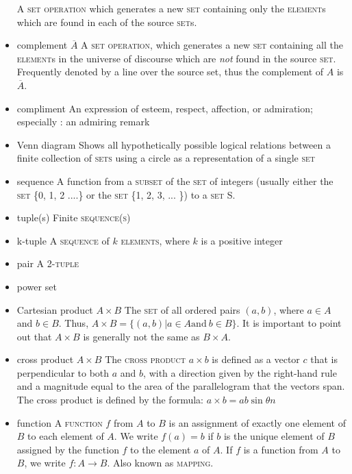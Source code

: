 \documentclass{article}
\newcommand{\term}[1]{\textsc{#1}}
\begin{document}
\begin{itemize}
  \subitem A \term{set operation} which generates a new \term{set} containing only the \term{element}s which are found in each of the source \term{set}s.
\item complement $\overline{A}$
  \subitem A \term{set operation}, which generates a new \term{set} containing all the \term{element}s in the universe of discourse which are \emph{not} found in the source \term{set}.  Frequently denoted by a line over the source set, thus the complement of $A$ is $\overline{A}$.
\item compliment
  \subitem An expression of esteem, respect, affection, or admiration; especially : an admiring remark 
\item Venn diagram
  \subitem Shows all hypothetically possible logical relations between a finite collection of \term{sets} using a circle as a representation of a single \term{set}
\item sequence
  \subitem A function from a \term{subset} of the \term{set} of integers (usually either the \term{set} \{0, 1, 2 ....\} or the \term{set} \{1, 2, 3, ... \}) to a \term{set} S. 
\item tuple(s)
   \subitem Finite \term{sequence(s)}
\item k-tuple
   \subitem A \term{sequence} of $k$ \term{elements}, where $k$ is a positive integer
\item pair
   \subitem A 2-\term{tuple}
\item power set 

\item Cartesian product $A \times B$
  \subitem The \term{set} of all ordered pairs $(a, b)$, where $a \in A$ and $b \in B$. Thus, $A \times B = \{(a,b) | a\in A \text{and} \ b\in B\}$. It is important to point out that $A \times B$ is generally not the same as $B \times A$.

\item cross product $A \times B$
  \subitem The \term{cross product} $a \times b$ is defined as a vector $c$ that is perpendicular to both $a$ and $b$, with a direction given by the right-hand rule and a magnitude equal to the area of the parallelogram that the vectors span. The cross product is defined by the formula: $a \times b = a b \sin \theta n$

\item function
  \subitem A \term{function} $f$ from $A$ to $B$ is an assignment of exactly one element of $B$ to each element of $A$. We write $f(a) = b$ if $b$ is the unique element of $B$ assigned by the function $f$ to the element $a$ of $A$. If $f$ is a function from $A$ to $B$, we write $f \colon A \to B$. Also known as \term{mapping}.


\end{itemize}
\end{document}
